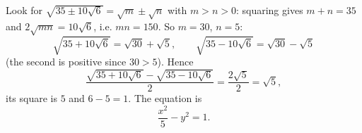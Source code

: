 Look for $\sqrt{35\pm10\sqrt6}=\sqrt m\pm\sqrt n$ with $m>n>0$: squaring gives $m+n=35$ and $2\sqrt{mn}=10\sqrt6$, i.e. $mn=150$. So $m=30$, $n=5$:
\[
\sqrt{35+10\sqrt6}=\sqrt{30}+\sqrt5,\qquad \sqrt{35-10\sqrt6}=\sqrt{30}-\sqrt5
\]
(the second is positive since $30>5$). Hence
\[
\dfrac{\sqrt{35+10\sqrt6}-\sqrt{35-10\sqrt6}}{2}=\dfrac{2\sqrt5}{2}=\sqrt5,
\]
its square is $5$ and $6-5=1$. The equation is
\[
\boxed{\dfrac{x^2}{5}-y^2=1}.
\]
